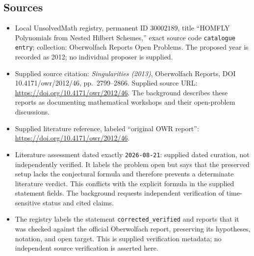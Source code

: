 \documentclass[11pt]{article}
\begin{document}
\subsection{Sources}
\begin{itemize}
\item Local UnsolvedMath registry, permanent ID \(30002189\), title ``HOMFLY Polynomials from Nested Hilbert Schemes,'' exact source code \texttt{catalogue entry}; collection: Oberwolfach Reports Open Problems. The proposed year is recorded as 2012; no individual proposer is supplied.
\item Supplied source citation: \emph{Singularities (2013)}, Oberwolfach Reports, DOI 10.4171/owr/2012/46, pp.\ 2799--2866. Supplied source URL: \url{https://doi.org/10.4171/owr/2012/46}. The background describes these reports as documenting mathematical workshops and their open-problem discussions.
\item Supplied literature reference, labeled ``original OWR report'': \url{https://doi.org/10.4171/owr/2012/46}.
\item Literature assessment dated exactly \texttt{2026-08-21}: supplied dated curation, not independently verified. It labels the problem open but says that the preserved setup lacks the conjectural formula and therefore prevents a determinate literature verdict. This conflicts with the explicit formula in the supplied statement fields. The background requests independent verification of time-sensitive status and cited claims.
\item The registry labels the statement \texttt{corrected\_verified} and reports that it was checked against the official Oberwolfach report, preserving its hypotheses, notation, and open target. This is supplied verification metadata; no independent source verification is asserted here.
\end{itemize}
\end{document}
